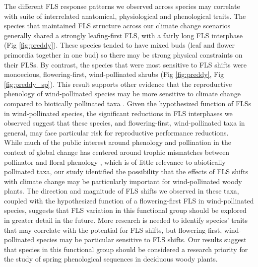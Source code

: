 \documentclass[11pt]{article}\usepackage[]{graphicx}\usepackage[]{color}
\begin{document}
\noindent The different FLS response patterns we observed across species may correlate with suite of interrelated anatomical, physiological and phenological traits. The species that maintained FLS structure across our climate change scenarios generally shared a strongly leafing-first FLS, with a fairly long FLS interphase (Fig \ref{fig:preddy}). These species tended to have mixed buds (leaf and flower primordia together in one bud) so there may be strong physical constraints on their FLSs. By contrast, the species that were most sensitive to FLS shifts were monoecious, flowering-first, wind-pollinated shrubs (Fig \ref{fig:preddy}, Fig \ref{fig:preddy_sp}). This result supports other evidence that the reproductive phenology of wind-pollinated species may be more sensitive to climate change compared to biotically pollinated taxa \citep{Ziello:2012aa}. Given the hypothesized function of FLSs in wind-pollinated species, the significant reductions in FLS interphases we observed suggest that these species, and flowering-first, wind-pollinated taxa in general, may face particular risk for reproductive performance reductions.\\

\noindent While much of the public interest around phenology and pollination in the context of global change has centered around trophic mismatches between pollinator and floral phenology \citep{Memmott2007}, which is of little relevance to abiotically pollinated taxa, our study identified the possibility that the effects of FLS shifts with climate change may be particularly important for wind-pollinated woody plants. The direction and magnitude of FLS shifts we observed in these taxa, coupled with the hypothesized function of a flowering-first FLS in wind-pollinated species, suggests that FLS variation in this functional group should be explored in greater detail in the future. More research is needed to identify species' traits that may correlate with the potential for FLS shifts, but flowering-first, wind-pollinated species may be particular sensitive to FLS shifts. Our results suggest that species in this functional group should be considered a research priority for the study of spring phenological sequences in deciduous woody plants.\\ 


 
\end{document}
